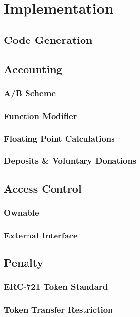 
\chapter{Implementation}
\label{chp:implementation}

\section{Code Generation}

\section{Accounting}

\subsection{A/B Scheme}
\subsection{Function Modifier}
\subsection{Floating Point Calculations}
\subsection{Deposits \& Voluntary Donations}

\section{Access Control}
\subsection{Ownable}
\subsection{External Interface}

\section{Penalty}
\subsection{ERC-721 Token Standard}
\subsection{Token Transfer Restriction}